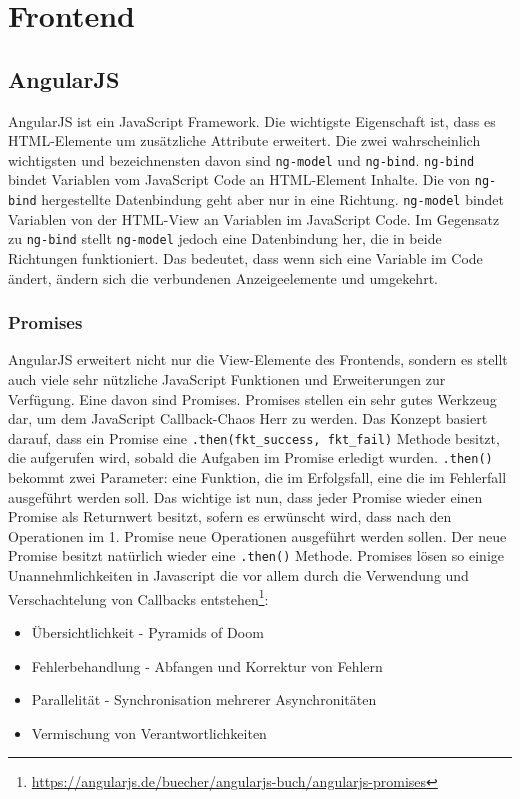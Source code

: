 \section{Frontend}

\subsection{AngularJS}

AngularJS ist ein JavaScript Framework. Die wichtigste Eigenschaft ist, dass es HTML-Elemente um zusätzliche Attribute erweitert. Die zwei wahrscheinlich wichtigsten und bezeichnensten davon sind \verb|ng-model| und \verb|ng-bind|. \verb|ng-bind| bindet Variablen vom JavaScript Code an HTML-Element Inhalte. Die von \verb|ng-bind| hergestellte Datenbindung geht aber nur in eine Richtung. \verb|ng-model| bindet Variablen von der HTML-View an Variablen im JavaScript Code. Im Gegensatz zu \verb|ng-bind| stellt \verb|ng-model| jedoch eine Datenbindung her, die in beide Richtungen funktioniert. Das bedeutet, dass wenn sich eine Variable im  Code ändert, ändern sich die verbundenen Anzeigeelemente und umgekehrt.

\subsubsection{Promises}
AngularJS erweitert nicht nur die View-Elemente des Frontends, sondern es stellt auch viele sehr nützliche JavaScript Funktionen und Erweiterungen zur Verfügung. Eine davon sind Promises. Promises stellen ein sehr gutes Werkzeug dar, um dem JavaScript Callback-Chaos Herr zu werden. Das Konzept basiert darauf, dass ein Promise eine \verb|.then(fkt_success, fkt_fail)| Methode besitzt, die aufgerufen wird, sobald die Aufgaben im Promise erledigt wurden. \verb|.then()| bekommt zwei Parameter: eine Funktion, die im Erfolgsfall, eine die im Fehlerfall ausgeführt werden soll. Das wichtige ist nun, dass jeder Promise wieder einen Promise als Returnwert besitzt, sofern es erwünscht wird, dass nach den Operationen im 1. Promise neue Operationen ausgeführt werden sollen. Der neue Promise besitzt natürlich wieder eine \verb|.then()| Methode. Promises lösen so einige Unannehmlichkeiten in Javascript die vor allem durch die Verwendung und Verschachtelung von Callbacks entstehen\footnote{\url{https://angularjs.de/buecher/angularjs-buch/angularjs-promises}}:

\begin{itemize}
	\item Übersichtlichkeit - Pyramids of Doom
	\item Fehlerbehandlung - Abfangen und Korrektur von Fehlern
	\item Parallelität - Synchronisation mehrerer Asynchronitäten
	\item Vermischung von Verantwortlichkeiten
\end{itemize}

